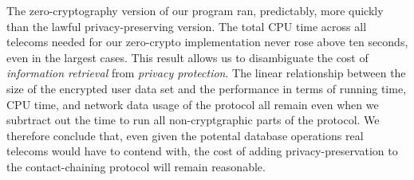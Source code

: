 The zero-cryptography version of our program ran, predictably, more quickly than the lawful privacy-preserving version. The total CPU time across all telecoms needed for our zero-crypto implementation never rose above ten seconds, even in the largest cases. This result allows us to disambiguate the cost of \emph{information retrieval} from \emph{privacy protection}. The linear relationship between the size of the encrypted user data set and the performance in terms of running time, CPU time, and network data usage of the protocol all remain even when we subrtract out the time to run all non-cryptgraphic parts of the protocol. We therefore conclude that, even given the potental database operations real telecoms would have to contend with, the cost of adding privacy-preservation to the contact-chaining protocol will remain reasonable.
